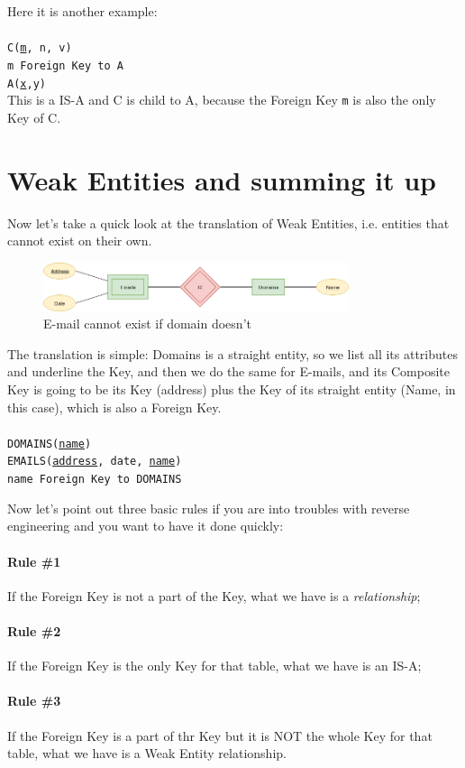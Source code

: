 \documentclass[class=book, crop=false, oneside]{standalone}
\newcommand\tab[1][1cm]{\hspace*{#1}}
\begin{document}
\vskip 5pt
Here it is another example:\\\\
\texttt{C(\underline{m}, n, v)}\\
\tab[.4cm] \texttt{m Foreign Key to A}\\
\texttt{A(\underline{x},y)}\\
\vskip 5pt
This is a IS-A and C is child to A, because the Foreign Key \texttt{m} is also the only Key of C.

\section{Weak Entities and summing it up}
Now let's take a quick look at the translation of Weak Entities, i.e. entities that cannot exist on their own.\\
\begin{figure}[H]
	\includegraphics[width=0.8\textwidth,keepaspectratio]{diagram4_00.png}
	\caption{E-mail cannot exist if domain doesn't}
	\label{diagram4_00}
\end{figure}
\vskip 5pt
The translation is simple: Domains is a straight entity, so we list all its attributes and underline the Key, and then we do the same for E-mails, and its Composite Key is going to be its Key (address) plus the Key of its straight entity (Name, in this case), which is also a Foreign Key.\\\\
\texttt{DOMAINS(\underline{name})}\\
\texttt{EMAILS(\underline{address}, date, \underline{name})}\\
\tab[.4cm] \texttt{name Foreign Key to DOMAINS}
\vskip 5pt

Now let's point out three basic rules if you are into troubles with reverse engineering and you want to have it done quickly:
\paragraph{Rule \#1} If the Foreign Key is not a part of the Key, what we have is a \emph{relationship};
\paragraph{Rule \#2} If the Foreign Key is the only Key for that table, what we have is an IS-A;
\paragraph{Rule \#3} If the Foreign Key is a part of thr Key but it is NOT the whole Key for that table, what we have is a Weak Entity relationship.
\end{document}

